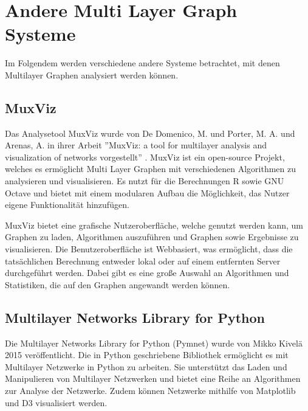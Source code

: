 \section{Andere Multi Layer Graph Systeme}

Im Folgendem werden verschiedene andere Systeme betrachtet, mit denen Multilayer Graphen analysiert werden können.

\subsection{MuxViz}

Das Analysetool MuxViz wurde von De Domenico, M. und Porter, M. A. und Arenas, A. in ihrer Arbeit ''MuxViz: a tool for multilayer analysis and visualization of networks vorgestellt'' \cite{De_Domenico_2014}.
MuxViz ist ein open-source Projekt, welches es ermöglicht Multi Layer Graphen mit verschiedenen Algorithmen zu analysieren und visualisieren. Es nutzt für die Berechnungen R sowie GNU Octave und bietet mit einem modularen Aufbau die Möglichkeit, das Nutzer eigene Funktionalität hinzufügen.


MuxViz bietet eine grafische Nutzeroberfläche, welche genutzt werden kann, um Graphen zu laden, Algorithmen auszuführen und Graphen sowie Ergebnisse zu visualisieren. Die Benutzeroberfläche ist Webbasiert, was ermöglicht, dass die tatsächlichen Berechnung entweder lokal oder auf einem entfernten Server durchgeführt werden.
Dabei gibt es eine große Auswahl an Algorithmen und Statistiken, die auf den Graphen angewandt werden können.



\subsection{Multilayer Networks Library for Python}

Die Multilayer Networks Library for Python (Pymnet) wurde von Mikko Kivelä 2015 veröffentlicht. 
Die in Python geschriebene Bibliothek ermöglicht es mit Multilayer Netzwerke in Python zu arbeiten. Sie unterstützt das Laden und Manipulieren von Multilayer Netzwerken und bietet eine Reihe an Algorithmen zur Analyse der Netzwerke.
Zudem können Netzwerke mithilfe von Matplotlib und D3 visualisiert werden.
